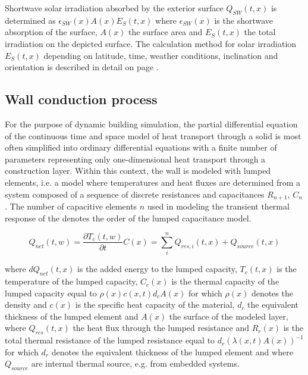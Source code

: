  Shortwave solar irradiation absorbed by the exterior surface $Q_{SW}(t,x)$ is determined as $\epsilon_{SW}(x) A(x) E_{S}(t,x)$ where $\epsilon_{SW}(x)$ is the shortwave absorption of the surface, $A(x)$ the surface area and $E_{S}(t,x)$ the total irradiation on the depicted surface. The calculation method for solar irradiation $E_{S}(t,x)$ depending on latitude, time, weather conditions, inclination and orientation is described in detail on page \pageref{chap:climsol}. 

\subsection{Wall conduction process}


For the purpose of dynamic building simulation, the partial differential equation of the continuous time and space model of heat transport through a solid is most often simplified into ordinary differential equations with a finite number of parameters representing only one-dimensional heat transport through a construction layer. Within this context, the wall is modeled with lumped elements, i.e. a model where temperatures and heat fluxes are determined from a system composed of a sequence of discrete resistances and capacitances $R_{n+1}$, $C_{n}$. The number of capacitive elements $n$ used in modeling the transient thermal response of the  denotes the order of the lumped capacitance model. 

\begin{equation}
Q_{net}(t,w) = \frac{\partial T_{c}(t,w)}{\partial t}C(x) = \sum_{i}^{n} Q_{res,i}(t,x) + Q_{source}(t,x)
\end{equation}

where $dQ_{net}(t,x)$ is the added energy to the lumped capacity, $T_{c}(t,x)$ is the temperature of the lumped capacity, $C_{c}(x)$ is the thermal capacity of the lumped capacity equal to $\rho(x)c(x,t)d_{c}A(x)$ for which $\rho(x)$ denotes the density and $c(x)$ is the specific heat capacity of the material, $d_{c}$ the equivalent thickness of the lumped element and $A(x)$ the surface of the modeled layer, where $Q_{res}(t,x)$ the heat flux through the lumped resistance and $R_{r}(x)$ is the total thermal resistance of the lumped resistance equal to $d_{r}\left(\lambda(x,t)A(x)\right)^{-1}$ for which $d_{r}$ denotes the equivalent thickness of the lumped element and where $Q_{source}$ are internal thermal source, e.g. from embedded systems.

